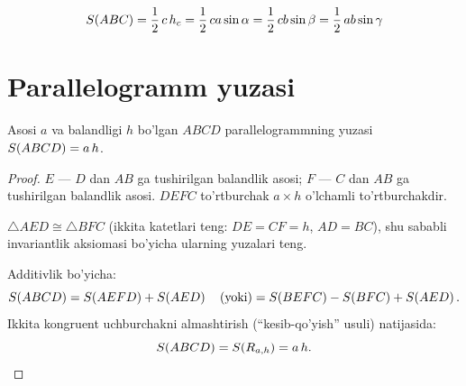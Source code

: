 \begin{formulabox}
\[
  S\!\left(ABC\right) = \frac{1}{2}\,c\,h_c
             = \frac{1}{2}\,ca\sin\alpha
             = \frac{1}{2}\,cb\sin\beta
             = \frac{1}{2}\,ab\sin\gamma
\]
\end{formulabox}

\section{Parallelogramm yuzasi}
\label{sec:para}

\begin{teorema}
\label{thm:para}
Asosi $a$ va balandligi $h$ bo'lgan $ABCD$ parallelogrammning yuzasi
$S\!\left(ABCD\right) = a\,h$.
\end{teorema}
\begin{proof}
$E$ — $D$ dan $AB$ ga tushirilgan balandlik asosi; $F$ — $C$ dan $AB$ ga
tushirilgan balandlik asosi.
$DEFC$ to'rtburchak $a \times h$ o'lchamli to'rtburchakdir.

$\triangle AED \cong \triangle BFC$ (ikkita katetlari teng: $DE=CF=h$,
$AD=BC$), shu sababli invariantlik aksiomasi bo'yicha ularning yuzalari teng.

Additivlik bo'yicha:
\[
  S\!\left(ABCD\right)
    = S\!\left(AEFD\right) + S\!\left(AED\right)
      \quad\text{(yoki)}
    = S\!\left(BEFC\right) - S\!\left(BFC\right) + S\!\left(AED\right).
\]
Ikkita kongruent uchburchakni almashtirish (``kesib-qo'yish'' usuli) natijasida:
\[
  S\!\left(ABCD\right) = S\!\left(R_{a,h}\right) = a\,h. \qedhere
\]
\end{proof}

